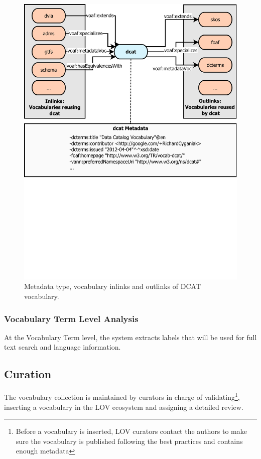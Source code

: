 \documentclass{iosart2c}
\begin{document}
\begin{figure}[ht!b]
\includegraphics[trim={0cm 10cm 0cm 0cm},width=1\textwidth]{FlowCharts/DCAT.pdf}
\caption{Metadata type, vocabulary inlinks and outlinks of DCAT vocabulary.}
\label{fig:dcat}
\end{figure}

\subsubsection{Vocabulary Term Level Analysis}
At the Vocabulary Term level, the system extracts labels that will be used for full text search and language information.

\subsection{Curation}

The vocabulary collection is maintained by curators in charge of validating\footnote{Before a vocabulary is inserted, LOV curators contact the authors to make sure the vocabulary is published following the best practices and contains enough metadata}, inserting a vocabulary in the LOV ecosystem and assigning a detailed review.
\end{document}
